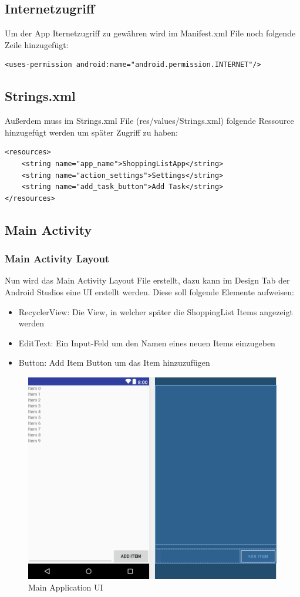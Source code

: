 \subsection{Internetzugriff}
Um der App Iternetzugriff zu gewähren wird im Manifest.xml File noch folgende Zeile hinzugefügt:
\begin{lstlisting}
<uses-permission android:name="android.permission.INTERNET"/>
\end{lstlisting}

\subsection{Strings.xml}
Außerdem muss im Strings.xml File (res/values/Strings.xml) folgende Ressource hinzugefügt werden um später Zugriff zu haben:
\begin{lstlisting}
<resources>
	<string name="app_name">ShoppingListApp</string>
	<string name="action_settings">Settings</string>
	<string name="add_task_button">Add Task</string>
</resources>
\end{lstlisting}

\subsection{Main Activity}
\subsubsection{Main Activity Layout}
Nun wird das Main Activity Layout File erstellt, dazu kann im Design Tab der Android Studios eine UI erstellt werden. Diese soll folgende Elemente aufweisen:
\begin{itemize}
	\item RecyclerView: Die View, in welcher später die ShoppingList Items angezeigt werden
	\item EditText: Ein Input-Feld um den Namen eines neuen Items einzugeben
	\item Button: Add Item Button um das Item hinzuzufügen
\end{itemize}

\begin{figure}[!h]
	\centering
	\includegraphics[width=0.6\linewidth]{images/layoutmain}
	\caption{Main Application UI}
	\label{fig:layoutmain}
\end{figure}

